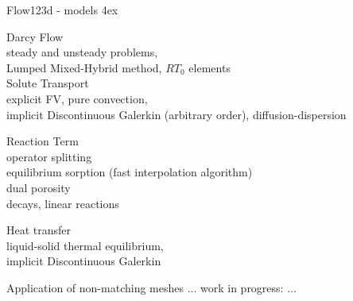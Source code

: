 \documentclass[10pt]{beamer} %
\begin{document}
\begin{frame}{Flow123d - models}
\parindent 4ex

\noindent
\textcolor{emph2}{Darcy Flow}\\
steady and unsteady problems,\\
Lumped Mixed-Hybrid method, $RT_0$ elements\\ 

\vspace{2ex}
\noindent
\textcolor{emph2}{Solute Transport}\\
explicit FV, pure convection,\\
implicit Discontinuous Galerkin (arbitrary order), diffusion-dispersion

\vspace{2ex}
\noindent
\textcolor{emph2}{Reaction Term}\\
operator splitting\\
equilibrium sorption (fast interpolation algorithm)\\
dual porosity\\
decays, linear reactions

\vspace{2ex}
\noindent
\textcolor{emph2}{Heat transfer}\\
liquid-solid thermal equilibrium,\\
implicit Discontinuous Galerkin

\end{frame}

\begin{frame}{Application of non-matching meshes}
 ... work in progress: ...
\end{frame}
\end{document}
